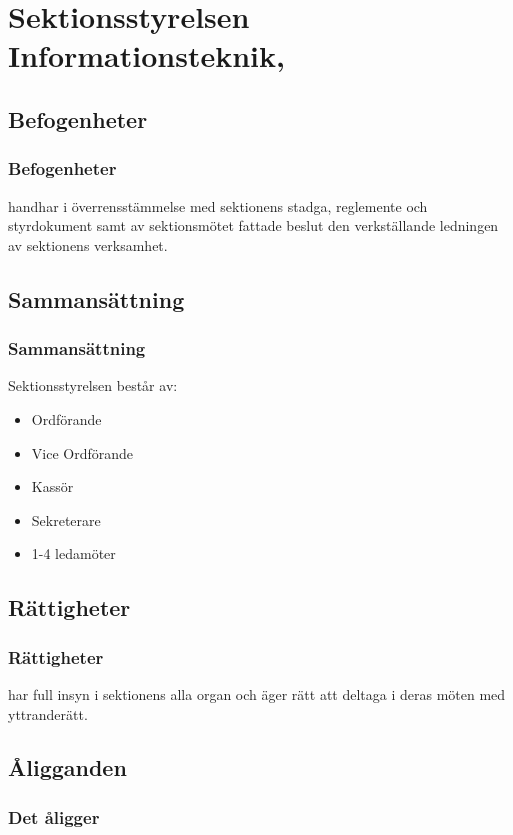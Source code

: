 \section{Sektionsstyrelsen Informationsteknik, \STYRIT}
 
\subsection{Befogenheter}
  
\subsubsection{Befogenheter}
\STYRIT{} handhar i överrensstämmelse med sektionens stadga, reglemente och
styrdokument samt av sektionsmötet fattade beslut den verkställande
ledningen av sektionens verksamhet.
 
\subsection{Sammansättning}
  
\subsubsection{Sammansättning}
Sektionsstyrelsen består av:
\begin{itemize}
	\item Ordförande
	\item Vice Ordförande
	\item Kassör
	\item Sekreterare
	\item 1-4 ledamöter
\end{itemize} 
 
\subsection{Rättigheter}
 
\subsubsection{Rättigheter}
\STYRIT{} har full insyn i sektionens alla organ och äger rätt att deltaga i deras
möten med yttranderätt.
  
\subsection{Åligganden}

\subsubsection{Det åligger \STYRIT}

